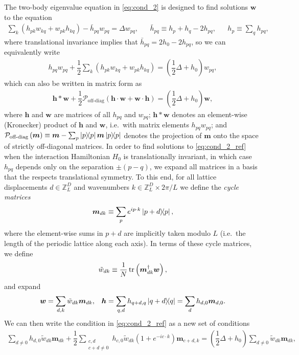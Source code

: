 \documentclass[nofootinbib,notitlepage,11pt]{revtex4-2}
\renewcommand{\t}{\text} %
\newcommand{\f}[2]{\dfrac{#1}{#2}} %
\newcommand{\p}[1]{\left(#1\right)} %
\renewcommand{\c}{\cdot} %
\newcommand{\m}{\bm} %
\newcommand{\1}{\mathds{1}}
\renewcommand{\P}{\mathcal{P}}
\newcommand{\ZZ}{\mathbb{Z}}
\begin{document}
The two-body eigenvalue equation in \eqref{eq:cond_2} is designed to
find solutions $\m w$ to the equation
\begin{align}
  \sum_k \p{h_{pk} w_{kq} + w_{pk} h_{kq}} - \bar h_{pq} w_{pq}
  = \Delta w_{pq},
  &&
  \bar h_{pq} \equiv h_p + h_q - 2h_{pq},
  &&
  h_p \equiv \sum_q h_{pq},
  \label{eq:cond_2_ref_start}
\end{align}
where translational invariance implies that
$\bar h_{pq}=2h_0-2h_{pq}$, so we can equivalently write
\begin{align}
  h_{pq} w_{pq}
  + \f12 \sum_k \p{h_{pk} w_{kq} + w_{pk} h_{kq}}
  = \p{\f12 \Delta + h_0} w_{pq},
\end{align}
which can also be written in matrix form as
\begin{align}
  \m h * \m w + \f12 \P_{\t{off-diag}}\p{\m h\c\m w + \m w\c\m h}
  = \p{\f12 \Delta + h_0} \m w,
  \label{eq:cond_2_ref}
\end{align}
where $\m h$ and $\m w$ are matrices of all $h_{pq}$ and $w_{pq}$;
$\m h*\m w$ denotes an element-wise (Kronecker) product of $\m h$ and
$\m w$, i.e.~with matrix elements $h_{pq}w_{pq}$; and
$\P_{\t{off-diag}}\p{\m m}\equiv \m m-\sum_p\op{p}\m m\op{p}$ denotes
the projection of $\m m$ onto the space of strictly off-diagonal
matrices.  In order to find solutions to \eqref{eq:cond_2_ref} when
the interaction Hamiltonian $H_0$ is translationally invariant, in
which case $h_{pq}$ depends only on the separation $\pm\p{p-q}$, we
expand all matrices in a basis that the respects translational
symmetry.  To this end, for all lattice displacements $d\in\ZZ_L^D$
and wavenumbers $k\in\ZZ_L^D\times2\pi/L$ we define the {\it cycle
  matrices}
\begin{align}
  \m m_{dk} \equiv \sum_p e^{ip\c k} \op{p+d}{p},
  \label{eq:cycle}
\end{align}
where the element-wise sums in $p+d$ are implicitly taken modulo $L$
(i.e.~the length of the periodic lattice along each axis).  In terms
of these cycle matrices, we define
\begin{align}
  \tilde w_{dk} \equiv \f1N \tr\p{\m m_{dk}^\dag \m w},
\end{align}
and expand
\begin{align}
  \m w = \sum_{d,k} \tilde w_{dk} \m m_{dk},
  &&
  \m h = \sum_{q,d} h_{q+d,q} \op{q+d}{q}
  = \sum_d h_{d,0} \m m_{d,0}.
\end{align}
We can then write the condition in \eqref{eq:cond_2_ref} as a new set
of conditions
\begin{align}
  \sum_{d\ne0} h_{d,0} \tilde w_{dk} \m m_{dk}
  + \f12 \sum_{\substack{c,d\\c+d\ne0}}
  h_{c,0} \tilde w_{dk} \p{1 + e^{-ic\c k}} \m m_{c+d,k}
  = \p{\f12\Delta + h_0} \sum_{d\ne0} \tilde w_{dk} \m m_{dk},
\end{align}
\end{document}
